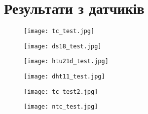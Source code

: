 
\chapter{Результати з датчиків}
\thispagestyle{headings}

\vspace*{-1.5em}
\begin{figure}[ht]
    \centering
    \begin{minipage}{0.5\textwidth}
        \texttt{[image: tc\_test.jpg]}
        \label{fig:tc_test}
    \end{minipage}
    \hspace{1em}
    \begin{minipage}{0.45\textwidth}
        \texttt{[image: ds18\_test.jpg]}
        \label{fig:ds18_test}
    \end{minipage}
\end{figure}

\begin{figure}[ht]
    \centering
    \begin{minipage}{0.5\textwidth}
        \texttt{[image: htu21d\_test.jpg]}
        \label{fig:htu21d_test}
    \end{minipage}
    \hspace{1em}
    \begin{minipage}{0.45\textwidth}
        \texttt{[image: dht11\_test.jpg]}
        \label{fig:dht11_test}
    \end{minipage}
\end{figure}

\begin{figure}[ht]
    \centering
    \begin{minipage}{0.5\textwidth}
        \texttt{[image: tc\_test2.jpg]}
        \label{fig:tc_test2}
    \end{minipage}
    \hspace{1em}
    \begin{minipage}{0.45\textwidth}
        \texttt{[image: ntc\_test.jpg]}
        \label{fig:ntc_test}
    \end{minipage}
\end{figure}

